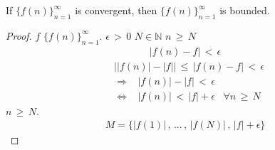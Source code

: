\begin{theorem}
    If $\{f(n)\}_{n = 1}^{\infty}$ is convergent, then $\{f(n)\}_{n = 1}^{\infty}$ is bounded.
    \begin{proof}
         $f$  $\{f(n)\}_{n = 1}^{\infty}$.  $\epsilon \hspace{2pt} > \hspace{2pt} 0$  $N \in \mathbb{N}$  $n \hspace{2pt} \geq \hspace{2pt} N$ 
        \begin{align*}
            \lvert f(n) - f \rvert \hspace{2pt} < \hspace{2pt} \epsilon
        \end{align*}
        \begin{align*}
            &\Big\lvert \lvert f(n) \rvert - \lvert f \rvert \Big\rvert \hspace{2pt} \leq \hspace{2pt} \lvert f(n) - f \rvert \hspace{2pt} < \hspace{2pt} \epsilon \\[1ex]
            &\Longrightarrow \hspace{10pt} \lvert f(n) \rvert - \lvert f \rvert \hspace{2pt} < \hspace{2pt} \epsilon \\[1ex]
            &\Longleftrightarrow \hspace{10pt} \lvert f(n) \rvert \hspace{2pt} < \hspace{2pt} \lvert f \rvert + \epsilon \hspace{10pt} \forall n \hspace{2pt} \geq \hspace{2pt} N
        \end{align*}
         $n \hspace{2pt} \geq \hspace{2pt} N$. 
        \begin{align*}
            M = \{\lvert f(1) \rvert \hspace{2pt}, \hspace{2pt} ... \hspace{2pt}, \hspace{2pt} \lvert f(N) \rvert \hspace{2pt}, \hspace{2pt} \lvert f \rvert + \epsilon\}

\end{align*}
\end{proof}
\end{theorem}
